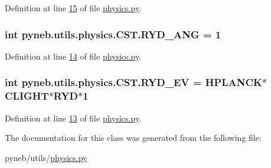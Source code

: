 Definition at line \hyperlink{physics_8py_source_l00015}{15} of file \hyperlink{physics_8py_source}{physics.\+py}.

\hypertarget{classpyneb_1_1utils_1_1physics_1_1_c_s_t_a43417605886b2dc4060af9388d7990bd}{}
\subsubsection[{R\+Y\+D\+\_\+\+A\+N\+G}]{\setlength{\rightskip}{0pt plus 5cm}int pyneb.\+utils.\+physics.\+C\+S\+T.\+R\+Y\+D\+\_\+\+A\+N\+G = 1\hspace{0.3cm}{\ttfamily [static]}}\label{classpyneb_1_1utils_1_1physics_1_1_c_s_t_a43417605886b2dc4060af9388d7990bd}


Definition at line \hyperlink{physics_8py_source_l00014}{14} of file \hyperlink{physics_8py_source}{physics.\+py}.

\hypertarget{classpyneb_1_1utils_1_1physics_1_1_c_s_t_a337f87b4676ea337149e177d81b481e1}{}
\subsubsection[{R\+Y\+D\+\_\+\+E\+V}]{\setlength{\rightskip}{0pt plus 5cm}int pyneb.\+utils.\+physics.\+C\+S\+T.\+R\+Y\+D\+\_\+\+E\+V = {\bf H\+P\+L\+A\+N\+C\+K}$\ast${\bf C\+L\+I\+G\+H\+T}$\ast${\bf R\+Y\+D}$\ast$1\hspace{0.3cm}{\ttfamily [static]}}\label{classpyneb_1_1utils_1_1physics_1_1_c_s_t_a337f87b4676ea337149e177d81b481e1}


Definition at line \hyperlink{physics_8py_source_l00013}{13} of file \hyperlink{physics_8py_source}{physics.\+py}.



The documentation for this class was generated from the following file\+:\begin{DoxyCompactItemize}
\item 
pyneb/utils/\hyperlink{physics_8py}{physics.\+py}\end{DoxyCompactItemize}
